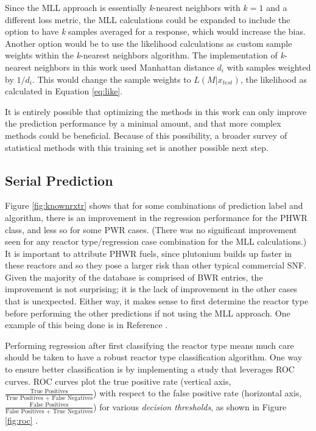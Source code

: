 Since the \gls{MLL} approach is essentially \textit{k}-nearest neighbors with
$k=1$ and a different loss metric, the \gls{MLL} calculations could be expanded
to include the option to have \textit{k} samples averaged for a response, which
would increase the bias.  Another option would be to use the likelihood
calculations as custom sample weights within the \textit{k}-nearest neighbors
algorithm. The implementation of \textit{k}-nearest neighbors in this work used
Manhattan distance $d_i$ with samples weighted by $1/d_i$. This would change
the sample weights to $L(M|x_{test})$, the likelihood as calculated in Equation
\ref{eq:like}.

It is entirely possible that optimizing the methods in this work can only
improve the prediction performance by a minimal amount, and that more complex
methods could be beneficial. Because of this possibility, a broader survey of
statistical methods with this training set is another possible next step. 

\subsection{Serial Prediction}

Figure \ref{fig:knownrxtr} shows that for some combinations of prediction label
and algorithm, there is an improvement in the regression performance for the
\gls{PHWR} class, and less so for some \gls{PWR} cases.  (There was no
significant improvement seen for any reactor type/regression case combination
for the \gls{MLL} calculations.) It is important to attribute \gls{PHWR} fuels,
since plutonium builds up faster in these reactors and so they pose a larger
risk than other typical commercial \gls{SNF}.  Given the majority of the
database is comprised of \gls{BWR} entries, the improvement is not surprising;
it is the lack of improvement in the other cases that is unexpected. Either
way, it makes sense to first determine the reactor type before performing the
other predictions if not using the \gls{MLL} approach. One example of this
being done is in Reference \cite{serial_ml}.

Performing regression after first classifying the reactor type means much care
should be taken to have a robust reactor type classification algorithm. One way
to ensure better classification is by implementing a study that leverages
\gls{ROC} curves. \Gls{ROC} curves plot the true positive rate (vertical axis,
$\frac{\text{True Positives}}{\text{True Positives + False Negatives}}$) with
respect to the false positive rate (horizontal axis, $\frac{\text{False
Positives}}{\text{False Positives + True Negatives}}$) for various
\textit{decision thresholds}, as shown in Figure \ref{fig:roc} \cite{roc}.

